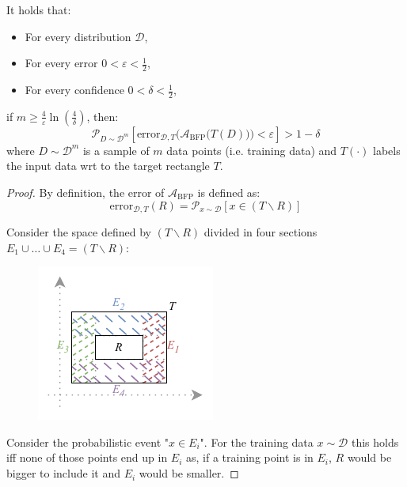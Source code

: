 \begin{theorem}
    It holds that:
    \begin{itemize}
        \item For every distribution $\mathcal{D}$,
        \item For every error $0 < \varepsilon < \frac{1}{2}$, 
        \item For every confidence $0 < \delta < \frac{1}{2}$,
    \end{itemize} 
    if $m \geq \frac{4}{\varepsilon}\ln\left( \frac{4}{\delta} \right)$, then:
    \[ 
        \mathcal{P}_{D \sim \mathcal{D}^m}
            \left[ \text{error}_{\mathcal{D}, T}\Big( \mathcal{A}_\text{BFP}\big(T(D)\big) \Big) < \varepsilon \right]  > 1 - \delta
    \]
    where $D \sim \mathcal{D}^m$ is a sample of $m$ data points (i.e. training data)
    and $T(\cdot)$ labels the input data wrt to the target rectangle $T$.

    \begin{proof}
        By definition, the error of $\mathcal{A}_\text{BFP}$ is defined as:
        \[ \text{error}_{\mathcal{D}, T}(R) = \mathcal{P}_{x \sim \mathcal{D}} [ x \in (T \smallsetminus R) ] \]

        Consider the space defined by $(T \smallsetminus R)$ divided in four sections $E_1 \cup \dots \cup E_4 = (T \smallsetminus R)$:
        \begin{figure}[H]
            \centering
            \includegraphics[width=0.4\linewidth]{./img/_rectangle_space.pdf}
        \end{figure}

        Consider the probabilistic event "$x \in E_i$".
        For the training data $x \sim \mathcal{D}$ this holds iff none of those points
        end up in $E_i$ as, if a training point is in $E_i$, $R$ would be bigger to include it and $E_i$ would be smaller.


\end{proof}
\end{theorem}
